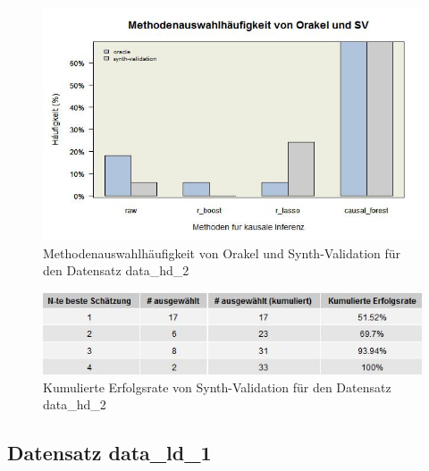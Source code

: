 \documentclass[12pt,a4paper,twoside]{scrartcl}
\numberwithin{equation}{section}
\newcounter{mypagecount}%
\newenvironment{interlude}{%
  \clearpage
  \setcounter{mypagecount}{\value{page}}%
  \thispagestyle{empty}%
  \pagestyle{empty}%
}{%
  \clearpage
  \setcounter{page}{\value{mypagecount}}%
}
\begin{document}
\begin{interlude}
\begin{appendices}
\begin{center}
\begin{figure}[H]
    \centering
    \includegraphics[height=0.5\textwidth, width=1\textwidth]{figures/plots/appendix/generatedDataHD2Barplot.jpeg}
    \caption[Methodenauswahlhäufigkeit von Orakel und Synth-Validation für den Datensatz data\_hd\_2]{Methodenauswahlhäufigkeit von Orakel und Synth-Validation für den Datensatz data\_hd\_2}
  \end{figure}
\end{center}

\begin{center}
\begin{figure}[H]
    \centering
    \includegraphics[height=0.2\textwidth, width=1\textwidth]{figures/plots/appendix/generatedDataHD2Grid.jpeg}
    \vspace{1mm}
    \caption[Kumulierte Erfolgsrate von Synth-Validation für den Datensatz data\_hd\_2]{Kumulierte Erfolgsrate von Synth-Validation für den Datensatz data\_hd\_2}
  \end{figure}
\end{center}

\subsection{Datensatz data\_ld\_1}


\end{appendices}
\end{interlude}
\end{document}
